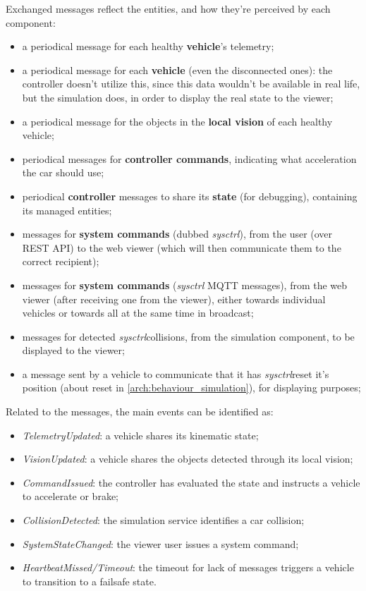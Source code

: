 Exchanged messages reflect the entities, and how they're perceived by each
component:
\begin{itemize}
  \item a periodical message for each healthy \textbf{vehicle}'s telemetry;
  \item a periodical message for each \textbf{vehicle} (even the disconnected
  ones): the controller doesn't utilize this, since this data wouldn't be
  available in real life, but the simulation does, in order to display the real
  state to the viewer;
  \item a periodical message for the objects in the \textbf{local vision} of
  each healthy vehicle;
  \item periodical messages for \textbf{controller commands}, indicating what
  acceleration the car should use;
  \item periodical \textbf{controller} messages to share its \textbf{state} (for
  debugging), containing its managed entities;
  \item messages for \textbf{system commands} (dubbed \textit{sysctrl}), from
  the user (over REST API) to the web viewer (which will then communicate them
  to the correct recipient);
  \item messages for \textbf{system commands} (\textit{sysctrl} MQTT messages),
  from the web viewer (after receiving one from the viewer), either towards
  individual vehicles or towards all at the same time in broadcast;
  \item messages for detected \textit{sysctrl}{collisions}, from the simulation
  component, to be displayed to the viewer;
  \item a message sent by a vehicle to communicate that it has
  \textit{sysctrl}{reset} it's position (about reset in
  \ref{arch:behaviour_simulation}), for displaying purposes;
\end{itemize}

Related to the messages, the main events can be identified as:
\begin{itemize}
  \item \textit{TelemetryUpdated}: a vehicle shares its kinematic state;
  \item \textit{VisionUpdated}: a vehicle shares the objects detected through
  its local vision;
  \item \textit{CommandIssued}: the controller has evaluated the state and
  instructs a vehicle to accelerate or brake;
  \item \textit{CollisionDetected}: the simulation service identifies a car
  collision;
  \item \textit{SystemStateChanged}: the viewer user issues a system command;
  \item \textit{HeartbeatMissed/Timeout}: the timeout for lack of messages
  triggers a vehicle to transition to a failsafe state.
\end{itemize}

